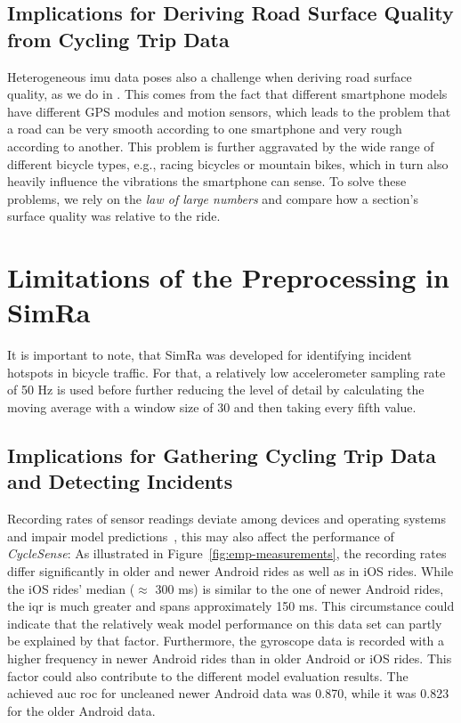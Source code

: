 \subsection*{Implications for Deriving Road Surface Quality from Cycling Trip Data}
Heterogeneous \ac{imu} data poses also a challenge when deriving road surface quality, as we do in .
This comes from the fact that different smartphone models have different GPS modules and motion sensors, which leads to the problem that a road can be very smooth according to one smartphone and very rough according to another.
This problem is further aggravated by the wide range of different bicycle types, e.g., racing bicycles or mountain bikes, which in turn also heavily influence the vibrations the smartphone can sense.
To solve these problems, we rely on the \textit{law of large numbers} and compare how a section's surface quality was relative to the ride. 

\section{Limitations of the Preprocessing in SimRa}
It is important to note, that SimRa was developed for identifying incident hotspots in bicycle traffic.
For that, a relatively low accelerometer sampling rate of 50 Hz is used before further reducing the level of detail by calculating the moving average with a window size of 30 and then taking every fifth value.

\subsection*{Implications for Gathering Cycling Trip Data and Detecting Incidents}
Recording rates of sensor readings deviate among devices and operating systems and impair model predictions~\cite{stisen2015smart}, this may also affect the performance of \textit{CycleSense}:
As illustrated in Figure~\ref{fig:emp-measurements}, the recording rates differ significantly in older and newer Android rides as well as in iOS rides.
While the iOS rides' median ($\approx$ 300 ms) is similar to the one of newer Android rides, the \ac{iqr} is much greater and spans approximately 150 ms.
This circumstance could indicate that the relatively weak model performance on this data set can partly be explained by that factor. 
Furthermore, the gyroscope data is recorded with a higher frequency in newer Android rides than in older Android or iOS rides.
This factor could also contribute to the different model evaluation results. 
The achieved \ac{auc} \ac{roc} for uncleaned newer Android data was 0.870, while it was 0.823 for the older Android data.

